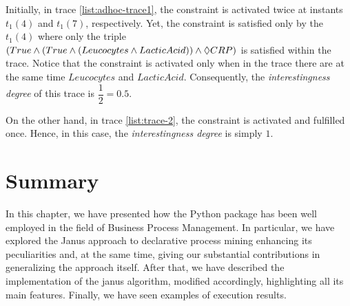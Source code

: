 \begin{example}
Initially, in trace \ref{list:adhoc-trace1}, the constraint is activated twice at instants $t_1(4)$ and $t_1(7)$, respectively. Yet, the constraint is satisfied only by the $t_1(4)$ where only the triple $(True \wedge (True \wedge (Leucocytes \wedge LacticAcid)) \wedge \Diamond CRP)$ is satisfied within the trace. Notice that the constraint is activated only when in the trace there are at the same time $Leucocytes$ and $LacticAcid$. Consequently, the \textit{interestingness degree} of this trace is $\dfrac{1}{2} = 0.5$.

On the other hand, in trace \ref{list:trace-2}, the constraint is activated and fulfilled once. Hence, in this case, the \textit{interestingness degree} is simply $1$.
\end{example}

\section{Summary}
In this chapter, we have presented how the \LTLfToDFA Python package has been well employed in the field of Business Process Management. In particular, we have explored the Janus approach to declarative process mining enhancing its peculiarities and, at the same time, giving our substantial contributions in generalizing the approach itself. After that, we have described the implementation of the janus algorithm, modified accordingly, highlighting all its main features. Finally, we have seen examples of execution results.















